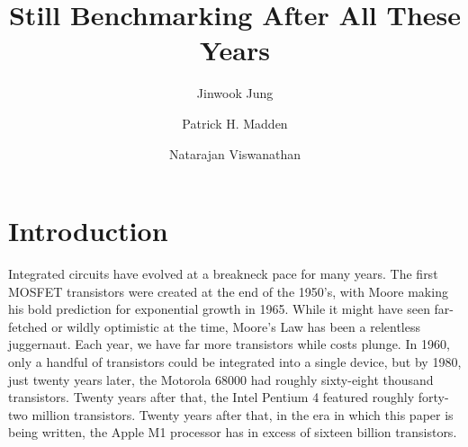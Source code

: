 \documentclass[sigconf]{acmart}
\begin{document}
\title{Still Benchmarking After All These Years}
\iffalse
\author{Blind Review}
\else
\author{Jinwook Jung}
\author{Patrick H. Madden}
\author{Natarajan Viswanathan}


 
\fi
\begin{abstract}

\end{abstract}

\begin{CCSXML}
\end{CCSXML}



%


\maketitle

\section{Introduction}

Integrated circuits have evolved at a breakneck pace for many years.  The
first MOSFET transistors were created at the end of the 1950's, with 
Moore\cite{Moore650114} making his bold prediction for exponential growth
in 1965.  While it might have seen far-fetched or wildly optimistic
at the time, Moore's Law has been a relentless juggernaut.
Each year, we have far more
transistors while costs plunge.
In 1960, only a handful of transistors could be integrated into a single
device, but by 1980, just twenty years later, the Motorola 68000 had
roughly sixty-eight thousand transistors.  Twenty years after that, the Intel Pentium 4
featured roughly forty-two million transistors.  Twenty years after that, in
the era in which this paper is being written, the Apple M1 processor has
in excess of sixteen billion transistors.
\end{document}

